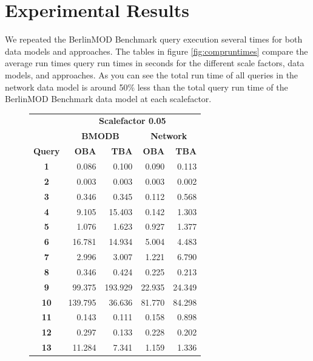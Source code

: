 \documentclass[a4paper]{article}
\newcommand{\bmodb} {BerlinMOD Benchmark}
\begin{document}
{\section{Experimental Results}
\label{sec:results}
We repeated the \bmodb{} query execution several times for both data models and
approaches. The tables in figure \ref{fig:compruntimes} compare the average run times
query run times in seconds for the different scale factors, data models, and approaches.
As you can see the total run time of all queries in the network data model is around
50\% less than the total query run time of the \bmodb{} data model at each scalefactor.
\begin{figure}[h]
  \begin{minipage}{0.5\linewidth}
    \begin{tiny}
      \begin{tabular}{|c|r|r|r|r|}
        \hline
        &\multicolumn{4}{c|}{\textbf{Scalefactor 0.05}}\\
        \cline{2-5}
        &\multicolumn{2}{c|}{\textbf{BMODB}}&\multicolumn{2}{c|}{\textbf{Network}}\\
        \hline
        \textbf{Query}&\textbf{OBA}&\textbf{TBA}&\textbf{OBA}&\textbf{TBA}\\
        \hline
        \textbf{1}&0.086&0.100&0.090&0.113\\
        \hline
        \textbf{2}&0.003&0.003&0.003&0.002\\
        \hline
        \textbf{3}&0.346&0.345&0.112&0.568\\
        \hline
        \textbf{4}&9.105&15.403&0.142&1.303\\
        \hline
        \textbf{5}&1.076&1.623&0.927&1.377\\
        \hline
        \textbf{6}&16.781&14.934&5.004&4.483\\
        \hline
        \textbf{7}&2.996&3.007&1.221&6.790\\
        \hline
        \textbf{8}&0.346&0.424&0.225&0.213\\
        \hline
        \textbf{9}&99.375&193.929&22.935&24.349\\
        \hline
        \textbf{10}&139.795&36.636&81.770&84.298\\
        \hline
        \textbf{11}&0.143&0.111&0.158&0.898\\
        \hline
        \textbf{12}&0.297&0.133&0.228&0.202\\
        \hline
        \textbf{13}&11.284&7.341&1.159&1.336\\

\end{tabular}
\end{tiny}
\end{minipage}
\end{figure}}
\end{document}
